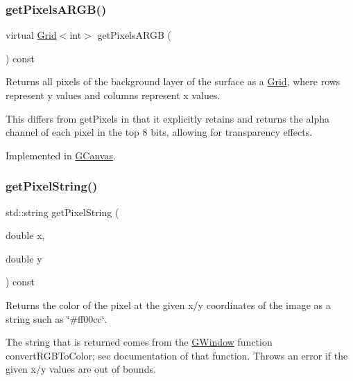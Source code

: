 \subsubsection{\texorpdfstring{get\+Pixels\+A\+R\+G\+B()}{getPixelsARGB()}}
{\footnotesize\ttfamily virtual \mbox{\hyperlink{classGrid}{Grid}}$<$int$>$ get\+Pixels\+A\+R\+GB (\begin{DoxyParamCaption}{ }\end{DoxyParamCaption}) const\hspace{0.3cm}{\ttfamily [pure virtual]}}



Returns all pixels of the background layer of the surface as a \mbox{\hyperlink{classGrid}{Grid}}, where rows represent y values and columns represent x values. 

This differs from get\+Pixels in that it explicitly retains and returns the alpha channel of each pixel in the top 8 bits, allowing for transparency effects. 

Implemented in \mbox{\hyperlink{classGCanvas_aca5a19f5f53c5cd29b832a769fde4f68}{G\+Canvas}}.

\mbox{\label{classGDrawingSurface_a8da04ef488ec5fa498fbbffaf50928fd}} 
\subsubsection{\texorpdfstring{get\+Pixel\+String()}{getPixelString()}}
{\footnotesize\ttfamily std\+::string get\+Pixel\+String (\begin{DoxyParamCaption}\item[{double}]{x,  }\item[{double}]{y }\end{DoxyParamCaption}) const\hspace{0.3cm}{\ttfamily [virtual]}}



Returns the color of the pixel at the given x/y coordinates of the image as a string such as \char`\"{}\#ff00cc\char`\"{}. 

The string that is returned comes from the {\ttfamily \mbox{\hyperlink{classGWindow}{G\+Window}}} function {\ttfamily convert\+R\+G\+B\+To\+Color}; see documentation of that function. Throws an error if the given x/y values are out of bounds. \mbox{\label{classGDrawingSurface_a9e983467cf0c97cfd62433a8471570dc}} 
